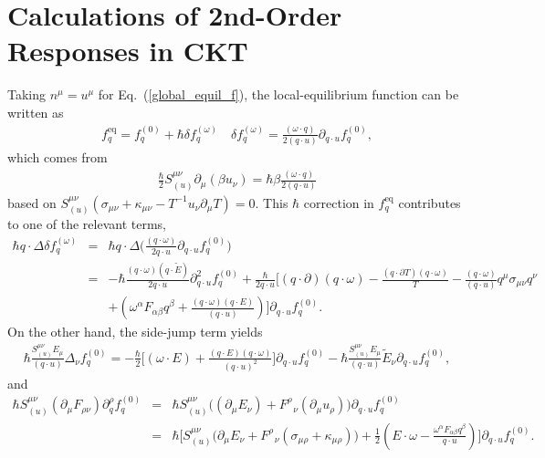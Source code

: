\documentclass[aps,prd,showkeys,preprint,amsmath,amssymb,nofootinbib]{revtex4-1}
\begin{document}
\section{Calculations of 2nd-Order Responses in CKT} \label{sec:2ndOrder}
Taking $n^{\mu}=u^{\mu}$ for Eq.~(\ref{global_equil_f}), the local-equilibrium function can be written as 
\begin{eqnarray}
f^\text{eq}_q=f^{(0)}_q+\hbar \delta f^{(\omega)}_q \quad \delta f^{(\omega)}_q=\frac{(\omega\cdot q)}{2(q\cdot u)}\partial_{q\cdot u}f^{(0)}_q,
\end{eqnarray}
which comes from 
\begin{eqnarray}
\frac{\hbar}{2}S^{\mu\nu}_{(u)}\partial_{\mu}(\beta u_{\nu})=
\hbar\beta\frac{(\omega\cdot q)}{2(q\cdot u)}
\end{eqnarray}
based on $S^{\mu\nu}_{(u)}(\sigma_{\mu\nu}+\kappa_{\mu\nu}-T^{-1}u_{\nu}\partial_{\mu}T)=0$. This $\hbar$ correction in $f^\text{eq}_q$ contributes to one of the relevant terms, 
\begin{eqnarray}\nonumber
\hbar q\cdot\Delta\delta f^{(\omega)}_q&=&\hbar q\cdot\Delta\Bigg(\frac{(q\cdot\omega)}{2q\cdot u}\partial_{q\cdot u}f^{(0)}_q\Bigg)
\\\nonumber
&=&-\hbar \frac{(q\cdot\omega)(q\cdot\tilde{E})}{2q\cdot u}\partial^2_{q\cdot u}f^{(0)}_q
+\frac{\hbar}{2q\cdot u}\Bigg[
(q\cdot\partial)(q\cdot\omega)
-\frac{(q\cdot\partial T)(q\cdot\omega)}{T}
-\frac{(q\cdot\omega)}{(q\cdot u)}q^{\mu}\sigma_{\mu\nu}q^{\nu}
\\
&&+\left(\omega^{\alpha}F_{\alpha\beta}q^{\beta}+\frac{(q\cdot\omega)(q\cdot E)}{(q\cdot u)}\right)\Bigg]\partial_{q\cdot u}f^{(0)}_q
.
\end{eqnarray}
On the other hand, the side-jump term yields 
\begin{eqnarray}
\hbar\frac{S^{\mu\nu}_{(u)}E_{\mu}}{(q\cdot u)}\Delta_{\nu}f^{(0)}_q=-\frac{\hbar}{2}\Bigg[(\omega\cdot E)+\frac{(q\cdot E)(q\cdot\omega)}{(q\cdot u)^2}\Bigg]\partial_{q\cdot u}f^{(0)}_q
-\hbar\frac{S^{\mu\nu}_{(u)}E_{\mu}}{(q\cdot u)}\tilde{E}_{\nu}\partial_{q\cdot u}f^{(0)}_q,
\end{eqnarray}
and
\begin{eqnarray}\nonumber
\hbar S^{\mu\nu}_{(u)}(\partial_{\mu}F_{\rho \nu})\partial^{\rho}_{q}f^{(0)}_q&=&\hbar S^{\mu\nu}_{(u)}\Big((\partial_{\mu}E_{\nu})+F^{\rho}_{\mbox{ }\nu}(\partial_{\mu}u_{\rho})\Big)\partial_{q\cdot u}f^{(0)}_q
\\
&=&\hbar\Bigg[ 
S^{\mu\nu}_{(u)}\Big(\partial_{\mu}E_{\nu}+F^{\rho}_{\mbox{ }\nu}\left(\sigma_{\mu\rho}+\kappa_{\mu\rho}\right)\Big)
+\frac{1}{2}\left(E\cdot \omega-\frac{\omega^{\alpha}F_{\alpha\beta}q^{\beta}}{q\cdot u}\right)\Bigg]\partial_{q\cdot u}f^{(0)}_q.
\end{eqnarray}
\end{document}
